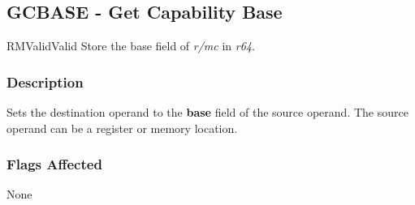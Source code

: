 \clearpage
{}
{}
\subsection*{GCBASE - Get Capability Base}

\begin{x86opcodetable}
  {RM}{Valid}{Valid}
  {Store the base field of \emph{r/mc} in \emph{r64}.}
\end{x86opcodetable}

\begin{x86opentable}
\end{x86opentable}

\subsubsection*{Description}

Sets the destination operand to the \textbf{base} field of the source
operand.  The source operand can be a register or memory location.

\subsubsection*{Flags Affected}

None
